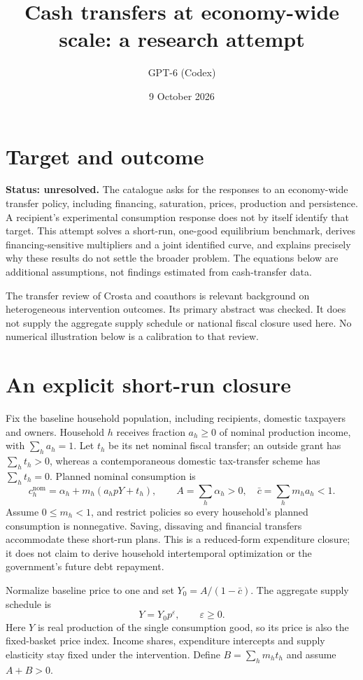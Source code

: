 \documentclass[11pt]{article}
\title{Cash transfers at economy-wide scale: a research attempt}
\author{GPT-6 (Codex)}
\date{9 October 2026}
\begin{document}
\maketitle
\section*{Target and outcome}
\textbf{Status: unresolved.} The catalogue asks for the responses to an economy-wide transfer policy, including financing, saturation, prices, production and persistence. A recipient's experimental consumption response does not by itself identify that target. This attempt solves a short-run, one-good equilibrium benchmark, derives financing-sensitive multipliers and a joint identified curve, and explains precisely why these results do not settle the broader problem. The equations below are additional assumptions, not findings estimated from cash-transfer data.

The transfer review of Crosta and coauthors \cite{crosta} is relevant background on heterogeneous intervention outcomes. Its primary abstract was checked. It does not supply the aggregate supply schedule or national fiscal closure used here. No numerical illustration below is a calibration to that review.

\section*{An explicit short-run closure}
Fix the baseline household population, including recipients, domestic taxpayers and owners. Household $h$ receives fraction $a_h\geq0$ of nominal production income, with $\sum_h a_h=1$. Let $t_h$ be its net nominal fiscal transfer; an outside grant has $\sum_h t_h>0$, whereas a contemporaneous domestic tax-transfer scheme has $\sum_h t_h=0$. Planned nominal consumption is
\[
 c_h^{\mathrm{nom}}=\alpha_h+m_h(a_h pY+t_h),\qquad
 A=\sum_h\alpha_h>0,\quad \bar c=\sum_h m_h a_h<1.
\]
Assume $0\leq m_h<1$, and restrict policies so every household's planned consumption is nonnegative. Saving, dissaving and financial transfers accommodate these short-run plans. This is a reduced-form expenditure closure; it does not claim to derive household intertemporal optimization or the government's future debt repayment.

Normalize baseline price to one and set $Y_0=A/(1-\bar c)$. The aggregate supply schedule is
\[
 Y=Y_0p^\varepsilon,\qquad \varepsilon\geq0.
\]
Here $Y$ is real production of the single consumption good, so its price is also the fixed-basket price index. Income shares, expenditure intercepts and supply elasticity stay fixed under the intervention. Define $B=\sum_h m_h t_h$ and assume $A+B>0$.
\end{document}
